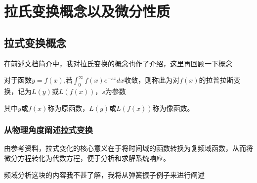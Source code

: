 \thispagestyle{fancy}
\pagecolor{gray!7}
\chapter{拉氏变换概念以及微分性质}
\section{拉式变换概念}

在前述文档简介中，我对拉氏变换的概念也作了介绍，这里再回顾一下概念

 对于函数$y=f(x)$,若$\int_{0}^{\infty}f\left(x\right)e^{-sx}dx$收敛，则称此为对$f(x)$的拉普拉斯变换，记为$L(y)$或$L(f(x))$，$s$为参数

其中$y$或$f(x)$称为原函数，$L(y)$或$L(f(x))$称为像函数。

\subsection*{从物理角度阐述拉式变换}

由参考资料，拉式变化的核心意义在于将时间域的函数转换为复频域函数，从而将微分方程转化为代数方程，便于分析和求解系统响应。

频域分析这块的内容我不甚了解，我将从弹簧振子例子来进行阐述


